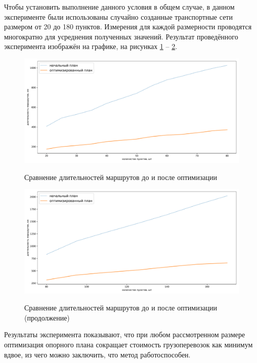 Чтобы установить выполнение данного условия в общем случае, в данном эксперименте были использованы случайно созданные транспортные сети размером от 20 до 180 пунктов. Измерения для каждой размерности проводятся многократно для усреднения полученных значений. Результат проведённого эксперимента изображён на графике, на рисунках \ref{exp:cmp} -- \ref{exp:cmp2}.

\begin{figure}[h!]
	\begin{center}
		{\includegraphics[scale=0.5, angle=0, page=1]{img/research/cmp.pdf}}
		\caption{Сравнение длительностей маршрутов до и после оптимизации}
		\label{exp:cmp}
	\end{center}
\end{figure}

\begin{figure}[h!]
	\begin{center}
		{\includegraphics[scale=0.5, angle=0, page=1]{img/research/cmp2.pdf}}
		\caption{Сравнение длительностей маршрутов до и после оптимизации (продолжение)}
		\label{exp:cmp2}
	\end{center}
\end{figure}

\pagebreak
Результаты эксперимента показывают, что при любом рассмотренном размере оптимизация опорного плана сокращает стоимость грузоперевозок как минимум вдвое, из чего можно заключить, что метод работоспособен.

